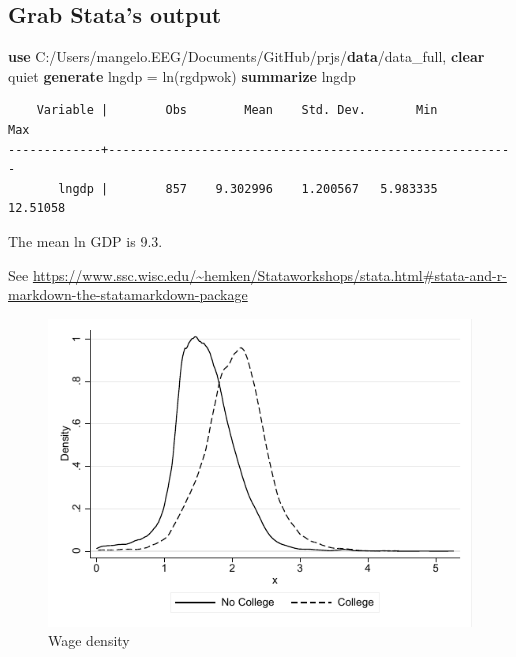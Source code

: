 \documentclass[
  12pt,
]{article}
\newenvironment{Shaded}{\begin{snugshade}}{\end{snugshade}}
\newcommand{\FunctionTok}[1]{\textcolor[rgb]{0.00,0.00,0.00}{#1}}
\newcommand{\KeywordTok}[1]{\textcolor[rgb]{0.13,0.29,0.53}{\textbf{#1}}}
\newcommand{\NormalTok}[1]{#1}
\begin{document}
\hypertarget{grab-statas-output}{%
\subsection{Grab Stata's output}\label{grab-statas-output}}

\begin{Shaded}
\begin{Highlighting}[]
\KeywordTok{use}\NormalTok{ C:/Users/mangelo.EEG/Documents/GitHub/prjs/}\KeywordTok{data}\NormalTok{/data\_full, }\KeywordTok{clear}
\NormalTok{        quiet }\KeywordTok{generate}\NormalTok{ lngdp = }\FunctionTok{ln}\NormalTok{(rgdpwok)}
      \KeywordTok{summarize}\NormalTok{ lngdp}
\end{Highlighting}
\end{Shaded}

\begin{verbatim}
    Variable |        Obs        Mean    Std. Dev.       Min        Max
-------------+---------------------------------------------------------
       lngdp |        857    9.302996    1.200567   5.983335   12.51058
\end{verbatim}

\vspace{0.3cm}

The mean ln GDP is 9.3.

\vspace{0.3cm}

See \url{https://www.ssc.wisc.edu/~hemken/Stataworkshops/stata.html\#stata-and-r-markdown-the-statamarkdown-package}

\begin{figure}
\centering
\includegraphics{logs/density.pdf}
\caption{Wage density}
\end{figure}
\end{document}
